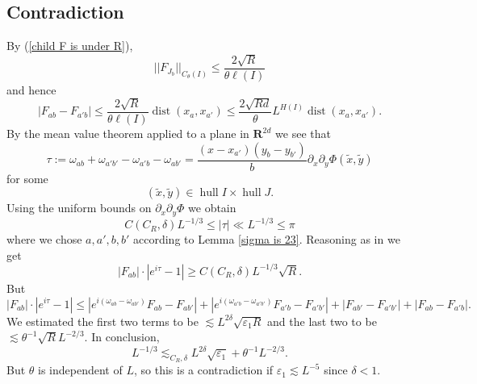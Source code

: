 \documentclass[reqno,10pt]{amsart}
\newcommand{\RR}{\mathbf{R}}
\DeclareMathOperator{\hull}{hull}
\DeclareMathOperator{\dist}{dist}
\theoremstyle{definition}
\numberwithin{equation}{section}
\begin{document}
\subsection{Contradiction}
By (\ref{child F is under R}),
$$||F_{J_b}||_{C_\theta(I)} \leq \frac{2\sqrt R}{\theta \ell(I)}$$
and hence 
$$|F_{ab} - F_{a'b}| \leq \frac{2\sqrt R}{\theta \ell(I)} \dist(x_a, x_{a'}) \leq \frac{2 \sqrt{Rd}}{\theta} L^{H(I)} \dist(x_a, x_{a'}).$$
By the mean value theorem applied to a plane in $\RR^{2d}$ we see that 
$$\tau := \omega_{ab} + \omega_{a'b'} - \omega_{a'b} - \omega_{ab'} = \frac{(x - x_{a'})(y_b - y_{b'})}{b} \partial_x \partial_y \Phi(\tilde x, \tilde y)$$
for some
$$(\tilde x, \tilde y) \in \hull I \times \hull J.$$
Using the uniform bounds on $\partial_x \partial_y \Phi$ we obtain 
$$C(C_R, \delta) L^{-1/3} \leq |\tau| \ll L^{-1/3} \leq \pi$$
where we chose $a, a', b, b'$ according to Lemma \ref{sigma is 23}.
Reasoning as in \cite[(3.30)]{Dyatlov_2018} we get 
$$|F_{ab}| \cdot |e^{i\tau} - 1| \geq C(C_R, \delta) L^{-1/3} \sqrt R.$$
But 
$$|F_{ab}| \cdot |e^{i\tau} - 1| \leq |e^{i(\omega_{ab} - \omega_{ab'})} F_{ab} - F_{ab'}| + |e^{i(\omega_{a'b} - \omega_{a'b'})} F_{a'b} - F_{a'b'}| + |F_{ab'} - F_{a'b'}| + |F_{ab} - F_{a'b}|.$$
We estimated the first two terms to be $\lesssim L^{2\delta} \sqrt{\varepsilon_1 R}$ and the last two to be $\lesssim \theta^{-1} \sqrt R L^{-2/3}$.
In conclusion,
$$L^{-1/3} \lesssim_{C_R, \delta} L^{2\delta} \sqrt{\varepsilon_1} + \theta^{-1} L^{-2/3}.$$
But $\theta$ is independent of $L$, so this is a contradiction if $\varepsilon_1 \lesssim L^{-5}$ since $\delta < 1$.



\printbibliography
\end{document}
